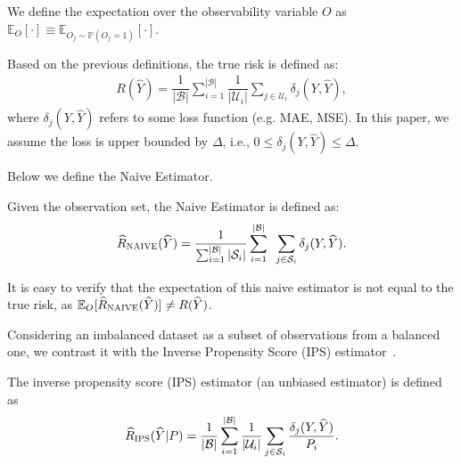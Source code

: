 \begin{definition}
We define the expectation over the observability variable $O$ as $\mathbb{E}_{O} [\cdot] \equiv \mathbb{E}_{O_{j} \sim \mathbb{P} (O_{j} = 1)} [\cdot]$.
\end{definition}

\begin{definition}
Based on the previous definitions, the true risk is defined as:
%
\begin{align*}
    R(\hat{Y}) = \dfrac{1}{|\mathcal{B}|} \sum_{i=1}^{|\mathcal{B}|} \dfrac{1}{|\mathcal{U}_{i}|} \sum_{j \in \mathcal{U}_{i}} \delta_{j} (Y, \hat{Y}),
\end{align*}
%
where $\delta_{j} (Y, \hat{Y})$ refers to some loss function (e.g. MAE, MSE). In this paper, we assume the loss is upper bounded by $\Delta$, i.e., $0 \leq \delta_{j} (Y, \hat{Y}) \leq \Delta$.
\end{definition}
Below we define the Naive Estimator.
\begin{definition}\label{def:naive}
Given the observation set, the Naive Estimator is defined as:
%
\begin{align*}
    \hat{R}_{\textsc{NAIVE}}(\hat{Y}) = \dfrac{1}{ \sum_{i=1}^{|\mathcal{B}|} |\mathcal{S}_{i}|} \sum_{i=1}^{|\mathcal{B}|} \enspace \sum_{j \in \mathcal{S}_{i}} \delta_{j} (Y, \hat{Y}).
\end{align*}
%
\end{definition}
It is easy to verify that the expectation of this naive estimator is not equal to the true risk, as $\mathbb{E}_{O} [\hat{R}_{\textsc{NAIVE}}(\hat{Y})] \neq R(\hat{Y})$.

Considering an imbalanced dataset as a subset of observations from a balanced one, we contrast it with the Inverse Propensity Score (IPS) estimator~\citep{schnabel2016recommendations}. %
\begin{definition}\label{def:ips}
The inverse propensity score (IPS) estimator (an unbiased estimator) is defined as
%
\begin{align*}
    \hat{R}_{\textsc{IPS}}(\hat{Y} | P) = \dfrac{1}{|\mathcal{B}|} \sum_{i=1}^{|\mathcal{B}|} \dfrac{1}{|\mathcal{U}_{i}|} \sum_{j \in \mathcal{S}_{i}} \dfrac{\delta_{j} (Y, \hat{Y})}{P_{i}}.
\end{align*}
\end{definition}

